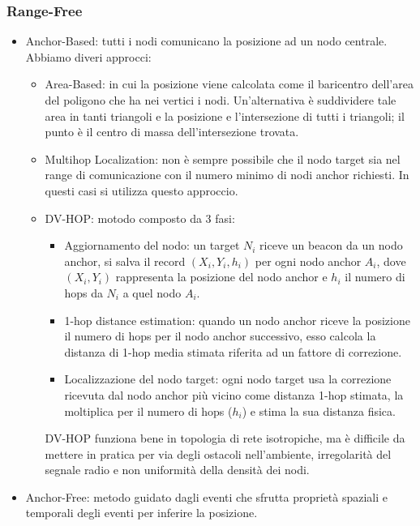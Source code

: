         \newpage

        \subsubsection{Range-Free}\label{subsubsec3.4.2}
        \begin{itemize}
                \item Anchor-Based: tutti i nodi comunicano la posizione ad un
nodo centrale. Abbiamo diveri approcci:
                \begin{itemize}
                        \item Area-Based: in cui la posizione viene calcolata
come il baricentro dell'area del poligono che ha nei vertici i nodi.
Un'alternativa è suddividere tale area in tanti triangoli e la posizione e
l'intersezione di tutti i triangoli; il punto è il centro di massa
dell'intersezione trovata.
                        \item Multihop Localization: non è sempre possibile che
il nodo target sia nel range di comunicazione con il numero minimo di nodi
anchor richiesti. In questi casi si utilizza questo approccio.
                        \item DV-HOP: motodo composto da 3 fasi:
                        \begin{itemize}
                                \item Aggiornamento del nodo: un target $N_i$
riceve un beacon da un nodo anchor, si salva il record $(X_i, Y_i, h_i)$ per
ogni nodo anchor $A_i$, dove $(X_i, Y_i)$ rappresenta la posizione del nodo
anchor e $h_i$ il numero di hops da $N_i$ a quel nodo $A_i$.
                                \item 1-hop distance estimation: quando un nodo
anchor riceve la posizione il numero di hops per il nodo anchor successivo, esso
calcola la distanza di 1-hop media stimata riferita ad un fattore di correzione.
                                \item Localizzazione del nodo target: ogni nodo
target usa la correzione ricevuta dal nodo anchor più vicino come distanza 1-hop
stimata, la moltiplica per il numero di hops ($h_i$) e stima la sua distanza
fisica.
                        \end{itemize}
                        DV-HOP funziona bene in topologia di rete isotropiche,
ma è difficile da mettere in pratica per via degli ostacoli nell'ambiente,
irregolarità del segnale radio e non uniformità della densità dei nodi.
                \end{itemize}
                \item Anchor-Free: metodo guidato dagli eventi che sfrutta
proprietà spaziali e temporali degli eventi per inferire la posizione.
        \end{itemize}

